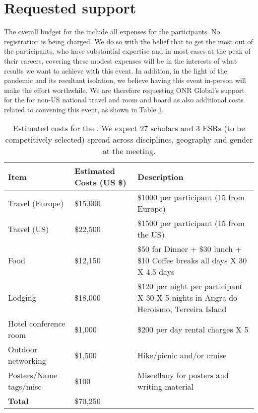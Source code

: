 \section{Requested  support}

The overall budget for the \symp include all expenses for the
participants. No
registration is being charged. We do so with the belief that to get
the most out of the participants, who have substantial expertise and
in most cases at the peak of their careers, covering these modest
expenses will be in the interests of what results we want to achieve
with this event. In addition, in the light of the pandemic and its
resultant isolation, we believe having this event in-person will make
the effort worthwhile.  We are therefore requesting ONR Global's
support for the \symp for non-US national travel and room and board as
also additional costs related to convening this event, as shown in
Table \ref{tab:budget}.

\begin{table}[!h]
  \footnotesize{
    \centering    
    \begin{tabular}{|p{3.5cm}|p{1.6cm}|p{10cm}|}
    \hline 
    \rowcolor{Gray}
    \bfseries Item& \bfseries Estimated Costs (US \$)&\bfseries Description\\
    \hline
      Travel (Europe)& \$15,000 & \$1000 per participant (15 from Europe) \\
    \hline
      Travel (US)& \$22,500 & \$1500 per participant (15 from the US) \\
    \hline
      Food& \$12,150 & \$50 for Dinner + \$30 lunch + \$10 Coffee
                       breaks all days X 30 X 4.5 days\\
    \hline
      Lodging& \$18,000 & \$120 per night per participant X 30 X 5 nights in Angra do Heroismo, Terceira Island\\
    \hline
      Hotel conference room &\$1,000 & \$200 per day rental charges X 5\\
    \hline
      Outdoor networking& \$1,500 & Hike/picnic and/or cruise\\
    \hline
      Posters/Name tags/misc& \$100 & Miscellany for posters and writing material\\
    \hline
    \textbf{Total}& \$70,250 &\\
    \hline        
  \end{tabular}
  \caption{Estimated costs for the \sympe. We expect 27 scholars and 3
    ESRs (to be competitively selected) spread across disciplines,
    geography and gender at the meeting.}
  \label{tab:budget}
}
\end{table}

